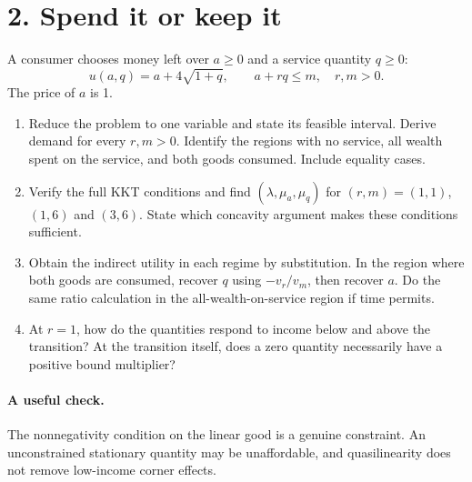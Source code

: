\section*{2. Spend it or keep it}
A consumer chooses money left over $a\ge0$ and a service quantity $q\ge0$:
\[
 u(a,q)=a+4\sqrt{1+q},\qquad a+rq\le m,\quad r,m>0.
\]
The price of $a$ is 1.
\begin{enumerate}[label=(\alph*)]
\item Reduce the problem to one variable and state its feasible interval. Derive demand for every $r,m>0$. Identify the regions with no service, all wealth spent on the service, and both goods consumed. Include equality cases.
\item Verify the full KKT conditions and find $(\lambda,\mu_a,\mu_q)$ for $(r,m)=(1,1)$, $(1,6)$ and $(3,6)$. State which concavity argument makes these conditions sufficient.
\item Obtain the indirect utility in each regime by substitution. In the region where both goods are consumed, recover $q$ using $-v_r/v_m$, then recover $a$. Do the same ratio calculation in the all-wealth-on-service region if time permits.
\item At $r=1$, how do the quantities respond to income below and above the transition? At the transition itself, does a zero quantity necessarily have a positive bound multiplier?
\end{enumerate}
\paragraph{A useful check.} The nonnegativity condition on the linear good is a genuine constraint. An unconstrained stationary quantity may be unaffordable, and quasilinearity does not remove low-income corner effects.
\clearpage
